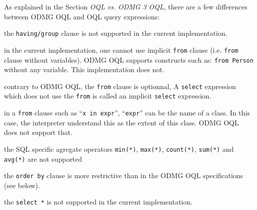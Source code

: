 As explained in the Section \emph{OQL vs. ODMG 3 OQL},
there are a few differences between ODMG OQL and \eyedb OQL query expressions:
\bi
\item the \texttt{having/group} clause is not
supported in the current implementation.
\item in the current implementation,
one cannot use implicit \texttt{from} clause (i.e. \texttt{from}
clause without variables). ODMG OQL supports constructs such as:
\texttt{from Person} without any variable. This implementation does not.
\item contrary to ODMG OQL, the \texttt{from} clause is optionnal,
A \texttt{select} expression which does not use the \texttt{from} is
called an implicit \texttt{select} expression.
\item in a \texttt{from} clause such as ``\texttt{x in expr}'', ``\texttt{expr}'' can
be the name of a class. In this case, the interpreter understand
this as the extent of this class. ODMG OQL does not support that.
\item the SQL specific agregate operators \texttt{min(*)},
\texttt{max(*)}, \texttt{count(*)}, \texttt{sum(*)} and \texttt{avg(*)}
are not supported
\item the \texttt{order by} clause is more restrictive than
in the ODMG OQL specifications (see below).
\item the \texttt{select *} is not supported in the current implementation.
\ei

